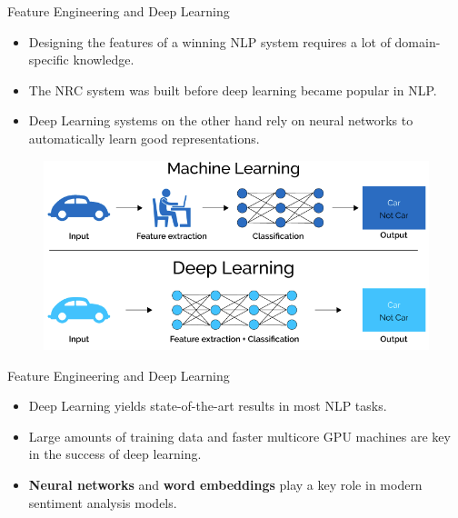 \documentclass[handout]{beamer}
\begin{document}
\begin{frame}{Feature Engineering and Deep Learning}
\begin{scriptsize}
\begin{itemize}
\item Designing the features of a winning NLP system requires a lot of domain-specific knowledge.
\item The NRC system was built before deep learning became popular in NLP.
\item Deep Learning systems on the other hand rely on neural networks to automatically learn good representations.
\end{itemize}
\end{scriptsize}


      \begin{figure}[h]
        	\includegraphics[scale = 0.25]{pics/MLvsDL.png}
        \end{figure} 




\end{frame}


\begin{frame}{Feature Engineering and Deep Learning}
\begin{scriptsize}
\begin{itemize}
\item Deep Learning yields state-of-the-art results in most NLP tasks. 
\item Large amounts of training data and faster multicore GPU machines are key in the success of deep learning. 
\item \textbf{Neural networks} and \textbf{word embeddings} play a key role in modern  sentiment analysis models.
\end{itemize}
\end{scriptsize}
\end{frame}
\end{document}
